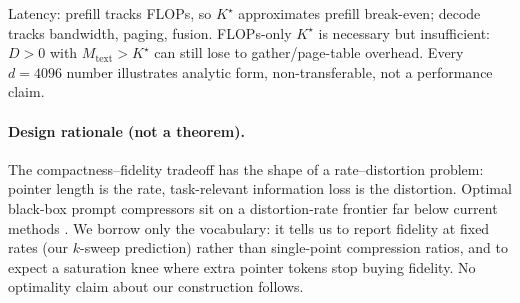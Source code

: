 Latency: prefill tracks FLOPs, so $K^{\star}$ approximates prefill break-even; decode tracks bandwidth, paging, fusion. FLOPs-only $K^{\star}$ is necessary but insufficient: $D>0$ with $M_{\mathrm{text}}>K^{\star}$ can still lose to gather/page-table overhead. Every $d=4096$ number illustrates analytic form, non-transferable, not a performance claim.

\paragraph{Design rationale (not a theorem).} The compactness--fidelity tradeoff has the shape of a rate--distortion problem: pointer length is the rate, task-relevant information loss is the distortion. Optimal black-box prompt compressors sit on a distortion-rate frontier far below current methods \cite{nagle2024fundamental}. We borrow only the vocabulary: it tells us to report fidelity at fixed rates (our $k$-sweep prediction) rather than single-point compression ratios, and to expect a saturation knee where extra pointer tokens stop buying fidelity. No optimality claim about our construction follows.
